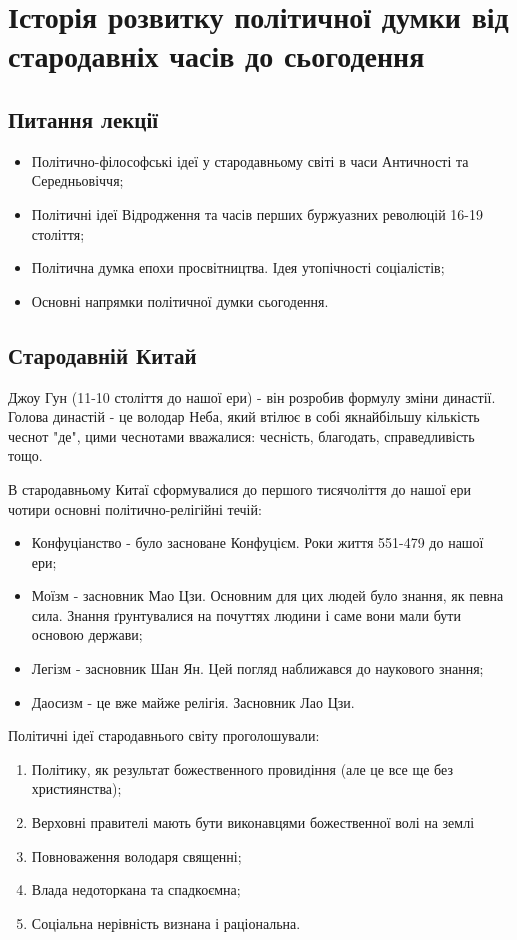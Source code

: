 \section{Історія розвитку політичної думки від стародавніх часів до сьогодення} 
\subsection{Питання лекції}
\begin{itemize}
\item Політично-філософські ідеї у стародавньому світі в часи Античності та Середньовіччя;
\item Політичні ідеї Відродження та часів перших буржуазних революцій 16-19 століття;
\item Політична думка епохи просвітництва. Ідея утопічності соціалістів;
\item Основні напрямки політичної думки сьогодення.
\end{itemize}
\subsection{Стародавній Китай}
Джоу Гун (11-10 століття до нашої ери) - він розробив формулу зміни династії. Голова династій - це володар Неба, який втілює в собі якнайбільшу кількість чеснот "де", цими чеснотами вважалися: чесність, благодать, справедливість тощо. 

В стародавньому Китаї сформувалися до першого тисячоліття до нашої ери чотири основні політично-релігійні течій:
\begin{itemize}
\item Конфуціанство - було засноване Конфуцієм. Роки життя 551-479 до нашої ери;
\item Моїзм - засновник Мао Цзи. Основним для цих людей було знання, як певна сила. Знання ґрунтувалися на почуттях людини і саме вони мали бути основою держави;
\item Легізм - засновник Шан Ян. Цей погляд наближався до наукового знання;
\item Даосизм - це вже майже релігія. Засновник Лао Цзи.
\end{itemize}

Політичні ідеї стародавнього світу проголошували:
\begin{enumerate}
\item Політику, як результат божественного провидіння (але це все ще без християнства);
\item Верховні правителі мають бути виконавцями божественної волі на землі
\item Повноваження володаря священні;
\item Влада недоторкана та спадкоємна;
\item Соціальна нерівність визнана і раціональна.
\end{enumerate}
